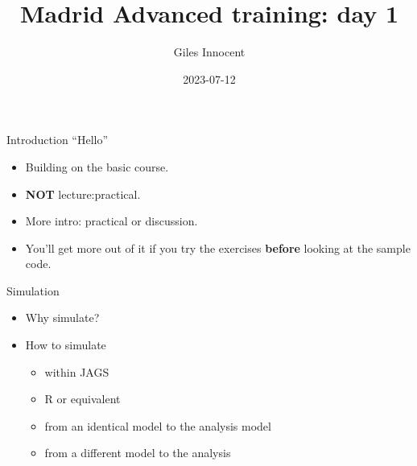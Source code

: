 \documentclass[
  ignorenonframetext,
]{beamer}
\title{Madrid Advanced training: day 1}
\author{Giles Innocent}
\date{2023-07-12}
\providecommand{\tightlist}{%
  \setlength{\itemsep}{0pt}\setlength{\parskip}{0pt}}
\begin{document}
\frame{\titlepage}

\begin{frame}{Introduction}
\protect\hypertarget{introduction}{}
\Huge``Hello''

\begin{itemize}
\tightlist
\item
  Building on the basic course.
\item
  \textbf{NOT} lecture:practical.
\item
  More intro: practical or discussion.
\item
  You'll get more out of it if you try the exercises \textbf{before}
  looking at the sample code.
\end{itemize}
\end{frame}

\begin{frame}{Simulation}
\protect\hypertarget{simulation}{}
\begin{itemize}
\tightlist
\item
  Why simulate?
\item
  How to simulate

  \begin{itemize}
  \tightlist
  \item
    within JAGS
  \item
    R or equivalent
  \item
    from an identical model to the analysis model
  \item
    from a different model to the analysis
  \end{itemize}
\end{itemize}
\end{frame}
\end{document}
